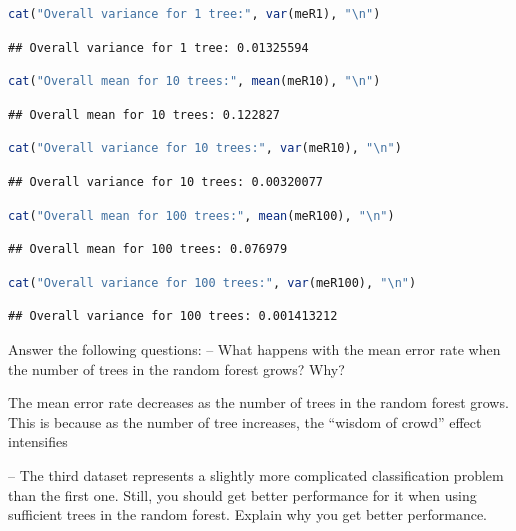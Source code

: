 \documentclass[
]{article}
\begin{document}
\begin{lstlisting}[language=R]
cat("Overall variance for 1 tree:", var(meR1), "\n")
\end{lstlisting}

\begin{lstlisting}
## Overall variance for 1 tree: 0.01325594
\end{lstlisting}

\begin{lstlisting}[language=R]
cat("Overall mean for 10 trees:", mean(meR10), "\n")
\end{lstlisting}

\begin{lstlisting}
## Overall mean for 10 trees: 0.122827
\end{lstlisting}

\begin{lstlisting}[language=R]
cat("Overall variance for 10 trees:", var(meR10), "\n")
\end{lstlisting}

\begin{lstlisting}
## Overall variance for 10 trees: 0.00320077
\end{lstlisting}

\begin{lstlisting}[language=R]
cat("Overall mean for 100 trees:", mean(meR100), "\n")
\end{lstlisting}

\begin{lstlisting}
## Overall mean for 100 trees: 0.076979
\end{lstlisting}

\begin{lstlisting}[language=R]
cat("Overall variance for 100 trees:", var(meR100), "\n")
\end{lstlisting}

\begin{lstlisting}
## Overall variance for 100 trees: 0.001413212
\end{lstlisting}

Answer the following questions: -- What happens with the mean error rate
when the number of trees in the random forest grows? Why?

The mean error rate decreases as the number of trees in the random
forest grows. This is because as the number of tree increases, the
``wisdom of crowd'' effect intensifies

-- The third dataset represents a slightly more complicated
classification problem than the first one. Still, you should get better
performance for it when using sufficient trees in the random forest.
Explain why you get better performance.
\end{document}

